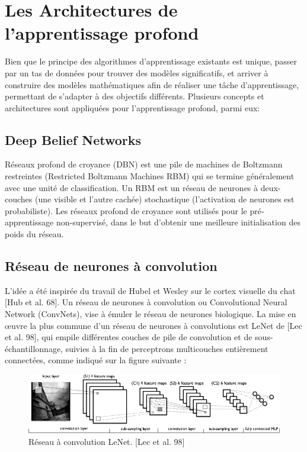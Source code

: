 \section{Les Architectures de l'apprentissage profond}

	Bien que le principe des algorithmes d'apprentissage existants est unique, passer par un tas de données pour trouver des modèles significatifs, et arriver à construire des modèles mathématiques afin de réaliser une tâche d'apprentissage, permettant de s'adapter à des objectifs différents. Plusieurs concepts et architectures sont appliquées pour l'apprentissage profond, parmi eux:

\subsection{Deep Belief Networks}

	Réseaux profond de croyance (DBN) est une pile de machines de Boltzmann restreintes (Restricted Boltzmann Machines RBM) qui se termine généralement avec une unité de classification. Un RBM est un réseau de neurones à deux-couches (une visible et l'autre cachée) stochastique (l'activation de neurones est probabiliste).
Les réseaux profond de croyance sont utilisés pour le pré-apprentissage non-supervisé, dans le but d'obtenir une meilleure initialisation des poids du réseau.


\subsection{Réseau de neurones à convolution}
	
	L'idée a été inspirée du travail de Hubel et Wesley sur le cortex visuelle du chat [Hub et al. 68]. Un réseau de neurones à convolution ou Convolutional Neural Network (ConvNets), vise à émuler le réseau de neurones biologique.
	La mise en œuvre la plus commune d'un réseau de neurones à convolutions est LeNet de [Lec et al. 98], qui empile différentes couches de pile de convolution et de sous-échantillonnage, suivies à la fin de perceptrons multicouches entièrement connectées, comme indiqué sur la figure suivante :

\begin{figure}[H]
	\centering
		\includegraphics[width=5in]{Figures/Mylenet.png}
	\caption[An Electron]{Réseau à convolution LeNet. [Lec et al. 98]}
	\label{fig:Electron}
\end{figure}

